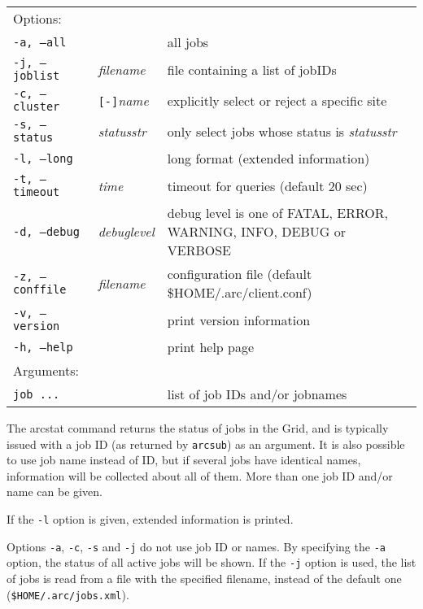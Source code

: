 \begin{shaded}
\end{shaded}
\begin{longtable}{llp{8cm}}
   Options:&&\\
   \texttt{-a, --all}& & all jobs\\
   \texttt{-j, --joblist}& \textit{filename}& file containing a list of jobIDs\\
   \texttt{-c, --cluster}&\verb#[-]#\textit{name}&explicitly select or reject a specific site\\
   \texttt{-s, --status}& \textit{statusstr} &only select jobs whose status is \textit{statusstr}\\
   \texttt{-l, --long}& & long format (extended information)\\
   \texttt{-t, --timeout}& \textit{time}& timeout for queries (default 20 sec)\\
   \texttt{-d, --debug}& \textit{debuglevel}&debug level is one of  FATAL, ERROR, WARNING, INFO, DEBUG or VERBOSE\\
   \texttt{-z, --conffile}&\textit{filename}& configuration file (default {\$}HOME/.arc/client.conf)\\
   \texttt{-v, --version}& & print version information\\
   \texttt{-h, --help}& & print help page\\
   Arguments:&&\\
   \texttt{job ...} && list of job IDs and/or jobnames\\
\end{longtable}

The arcstat command returns the status of jobs in the Grid, and is typically issued with a
job ID (as returned by \verb#arcsub#) as an argument. It is also possible to use job name instead of
ID, but if several jobs have identical names, information will be collected about all of them. 
More than one job ID and/or name can be given.

If the \verb#-l# option is given, extended information is printed.

Options \verb#-a#, \verb#-c#, \verb#-s# and \verb#-j# do not use job ID or names. By
specifying the \verb#-a# option, the status of all active jobs will be shown. If the \verb#-j# option
is used, the list of jobs is read from a file with the specified filename, instead of
the default one (\texttt{{\$}HOME/.arc/jobs.xml}).

